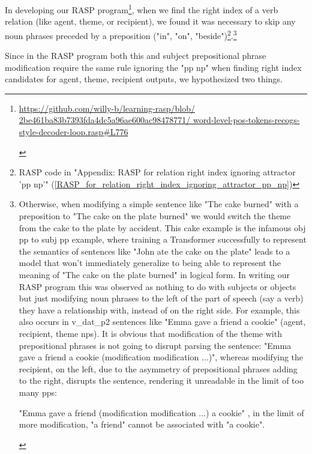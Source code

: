 \documentclass[11pt]{article}
\begin{document}
In developing our RASP program\footnote{\begin{footnotesize}\href{https://github.com/willy-b/learning-rasp/blob/2be461ba83b7393fda4dc5a96ae600ac98478771/word-level-pos-tokens-recogs-style-decoder-loop.rasp\#L776}{https://github.com/willy-b/learning-rasp/blob/
2be461ba83b7393fda4dc5a96ae600ac98478771/
word-level-pos-tokens-recogs-style-decoder-loop.rasp\#L776}
\end{footnotesize}
},
when we find the right index of a verb relation (like agent, theme, or recipient), 
we found it was necessary to skip any noun phrases preceded by a preposition ("in", "on", "beside")\footnote{RASP code in "Appendix: RASP for relation right index ignoring attractor 'pp np'" (\ref{RASP_for_relation_right_index_ignoring_attractor_pp_np})}.\footnote{\begin{footnotesize}Otherwise, when modifying a simple sentence like "The cake burned" with a preposition to "The cake on the plate burned" we would switch the theme from the cake to the plate by accident.
This cake example is the infamous obj pp to subj pp example, where training a Transformer successfully to represent the semantics of sentences like "John ate the cake on the plate" leads to a model that won't immediately generalize to being able to represent the meaning of "The cake on the plate burned" in logical form.
In writing our RASP program this was observed as nothing to do with subjects or objects but just modifying noun phrases to the left of the part of speech (say a verb) they have a relationship with, instead of on the right side. For example, this also occurs in v\_dat\_p2 sentences like "Emma gave a friend a cookie" (agent, recipient, theme nps). It is obvious that modification of the theme with prepositional phrases is not going to disrupt parsing the sentence: "Emma gave a friend a cookie (modification modification ...)", whereas modifying the recipient, on the left, due to the asymmetry of prepositional phrases adding to the right, disrupts the sentence, rendering it unreadable in the limit of too many pps:

"Emma gave a friend (modification modification ...) a cookie" , in the limit of more modification, "a friend" cannot be associated with "a cookie".
\end{footnotesize}}

Since in the RASP program both this and subject prepositional phrase modification require the same rule ignoring the "pp np" when finding right index candidates for agent, theme, recipient outputs, we hypothesized two things.
\end{document}
